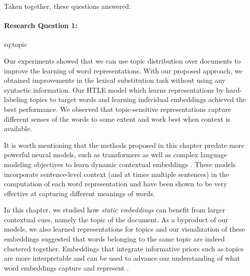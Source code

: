  \noindent  Taken together, these questions answered:

\paragraph{Research Question 1:} \acl{rq:topic} 

\medskip

 \noindent  Our experiments showed that we can use topic distribution over documents to improve the learning of word representations.
With our proposed approach, we obtained improvements in the lexical substitution task without using any syntactic information. 
Our HTLE model which learns representations by hard-labeling topics to target words and learning individual embeddings achieved the best performance.
We observed that topic-sensitive representations capture different senses of the words to some extent and work best when context is available. 

\medskip

 \noindent It is worth mentioning that the methods proposed in this chapter predate more powerful neural models, such as transformers as well as complex language modeling objectives to learn dynamic contextual embeddings \citep{peters-etal-2018-deep,radford2019language,devlin-etal-2019-bert}. 
These models incorporate sentence-level context (and at times multiple sentences) in the computation of each word representation and have been shown to be very effective at capturing different meanings of words.

In this chapter, we studied how \textit{static embeddings} can benefit from larger contextual cues, namely the topic of the document. 
As a byproduct of our models, we also learned representations for topics and our visualization of these embeddings suggested that words belonging to the same topic are indeed clustered together. 
Embeddings that integrate informative priors such as topics are more interpretable \citep{DBLP:journals/corr/abs-1807-07279} and can be used to advance our understanding of what word embeddings capture and represent \citep{hurtado-bodell-etal-2019-interpretable}.





 

